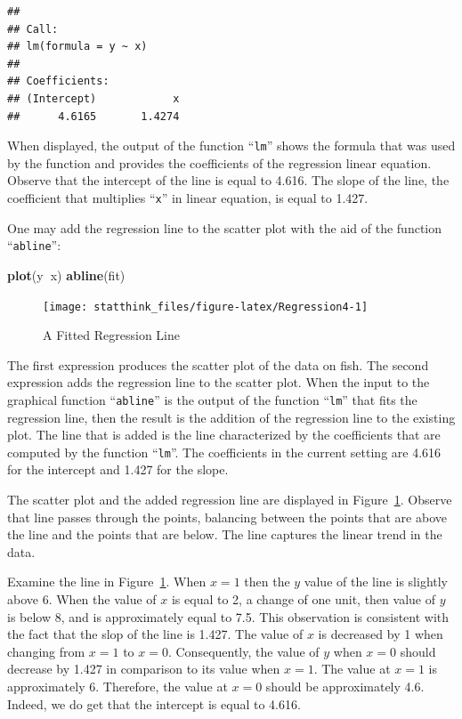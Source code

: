 \documentclass[]{krantz}
\makeatletter
\newenvironment{Shaded}{\begin{snugshade}}{\end{snugshade}}
\newcommand{\KeywordTok}[1]{\textcolor[rgb]{0.13,0.29,0.53}{\textbf{#1}}}
\newcommand{\OperatorTok}[1]{\textcolor[rgb]{0.81,0.36,0.00}{\textbf{#1}}}
\newcommand{\NormalTok}[1]{#1}
\newenvironment{kframe}{%
\medskip{}
\setlength{\fboxsep}{.8em}
 \def\at@end@of@kframe{}%
 \ifinner\ifhmode%
  \def\at@end@of@kframe{\end{minipage}}%
  \begin{minipage}{\columnwidth}%
 \fi\fi%
 \def\FrameCommand##1{\hskip\@totalleftmargin \hskip-\fboxsep
 \colorbox{shadecolor}{##1}\hskip-\fboxsep
     \hskip-\linewidth \hskip-\@totalleftmargin \hskip\columnwidth}%
 \MakeFramed {\advance\hsize-\width
   \@totalleftmargin\z@ \linewidth\hsize
   \@setminipage}}%
 {\par\unskip\endMakeFramed%
 \at@end@of@kframe}
\renewenvironment{Shaded}{\begin{kframe}}{\end{kframe}}
\theoremstyle{definition}
\theoremstyle{definition}
\theoremstyle{definition}
\theoremstyle{remark}
\makeatother
\begin{document}
\begin{verbatim}
## 
## Call:
## lm(formula = y ~ x)
## 
## Coefficients:
## (Intercept)            x  
##      4.6165       1.4274
\end{verbatim}

When displayed, the output of the function ``\texttt{lm}'' shows the
formula that was used by the function and provides the coefficients of
the regression linear equation. Observe that the intercept of the line
is equal to 4.616. The slope of the line, the coefficient that
multiplies ``\texttt{x}'' in linear equation, is equal to 1.427.

One may add the regression line to the scatter plot with the aid of the
function ``\texttt{abline}'':

\begin{Shaded}
\begin{Highlighting}[]
\KeywordTok{plot}\NormalTok{(y}\OperatorTok{~}\NormalTok{x)}
\KeywordTok{abline}\NormalTok{(fit)}
\end{Highlighting}
\end{Shaded}

\begin{figure}

{\centering \texttt{[image: statthink\_files/figure-latex/Regression4-1]} 

}

\caption{A Fitted Regression Line}\label{fig:Regression4}
\end{figure}

The first expression produces the scatter plot of the data on fish. The
second expression adds the regression line to the scatter plot. When the
input to the graphical function ``\texttt{abline}'' is the output of the
function ``\texttt{lm}'' that fits the regression line, then the result
is the addition of the regression line to the existing plot. The line
that is added is the line characterized by the coefficients that are
computed by the function ``\texttt{lm}''. The coefficients in the
current setting are 4.616 for the intercept and 1.427 for the slope.

The scatter plot and the added regression line are displayed in
Figure~\ref{fig:Regression4}. Observe that line passes through the
points, balancing between the points that are above the line and the
points that are below. The line captures the linear trend in the data.

Examine the line in Figure~\ref{fig:Regression4}. When \(x=1\) then the
\(y\) value of the line is slightly above 6. When the value of \(x\) is
equal to 2, a change of one unit, then value of \(y\) is below 8, and is
approximately equal to 7.5. This observation is consistent with the fact
that the slop of the line is 1.427. The value of \(x\) is decreased by 1
when changing from \(x=1\) to \(x=0\). Consequently, the value of \(y\)
when \(x=0\) should decrease by 1.427 in comparison to its value when
\(x=1\). The value at \(x=1\) is approximately 6. Therefore, the value
at \(x=0\) should be approximately 4.6. Indeed, we do get that the
intercept is equal to 4.616.
\end{document}
